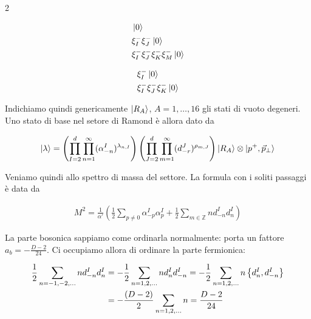 \documentclass{report}
\begin{document}
\begin{multicols}{2}
    \begin{center}
        \begin{align}
            &\ket{0} \notag \\
            &\xi_I^- \xi_J^-\ket{0} \notag \\
            &\xi_I^-\xi_J^-\xi_K^-\xi_M^-\ket{0} \notag \\    
        \end{align}
    \end{center}
    \columnbreak
    \begin{center}
        \begin{align}
            &\xi_I^-\ket{0} \notag \\
            &\xi_I^-\xi_J^-\xi_K^-\ket{0} \notag \\    
        \end{align}
    \end{center}
\end{multicols}

Indichiamo quindi genericamente \(\ket{R_A}\), \(A = 1, \ldots, 16\) gli stati di vuoto degeneri. Uno stato di base nel setore di Ramond è allora dato da 

\begin{align}
    \ket{\lambda} = \left(\prod_{I=2}^d\prod_{n=1}^\infty (\alpha_{-n}^I)^{\lambda_{n, I}}\right)\left(\prod_{J=2}^d\prod_{m=1}^\infty (d_{-r}^J)^{\rho_{m, J}}\right) \ket{R_A} \otimes \ket{p^+, \vec{p}_\perp}
\end{align}

Veniamo quindi allo spettro di massa del settore. La formula con i soliti passaggi è data da 

\begin{align}
    M^2 = \frac{1}{\alpha'}\left( \frac{1}{2}\sum_{p\neq 0}\alpha_{-p}^I \alpha_p^I + \frac{1}{2}\sum_{m \in \mathbb{Z}}n d_{-n}^I d_n^I \right)
\end{align}

La parte bosonica sappiamo come ordinarla normalmente: porta un fattore \(a_b = -\frac{D-2}{24}\). Ci occupiamo allora di ordinare la parte fermionica: 

\begin{align}
    \frac{1}{2}\sum_{n = -1, -2, \ldots} n d_{-n}^I d_n^I & = -\frac{1}{2}\sum_{n = 1, 2, \ldots} n d_n^I d_{-n}^I = -\frac{1}{2}\sum_{n = 1, 2, \ldots} n \left\{d_n^I, d_{-n}^I  \right\} \notag \\ 
    &= -\frac{(D-2)}{2}\sum_{n = 1, 2, \ldots} n = \frac{D-2}{24}
\end{align}
\end{document}
